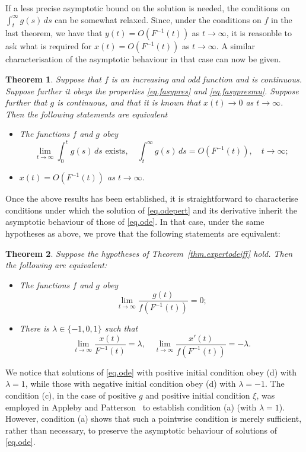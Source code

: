 \documentclass[a4paper,10pt,reqno]{amsart}
\numberwithin{equation}{section}
\newtheorem{theorem}{Theorem}
\theoremstyle{definition}
\theoremstyle{remark}
\DeclareMathOperator{\1}{\mathbbm 1}
\begin{document}
	If a less precise asymptotic bound on the solution is needed, the conditions on $\int_t^\infty g(s)\,ds$ can be somewhat relaxed. Since, under the conditions on $f$ in the last theorem, we have 
	that $y(t)=O(F^{-1}(t))$ as $t\to\infty$, it is reasonble to ask what is required for $x(t)=O(F^{-1}(t))$ as $t\to\infty$. A similar characterisation of the asymptotic behaviour in that case can now be given. 
	
	\begin{theorem} \label{thm.extpertodebdd}
		Suppose that $f$ is an increasing and odd function and is continuous. Suppose further it obeys the properties \eqref{eq.fasypres} and \eqref{eq.fasypresmu}. Suppose further that $g$ is continuous, and that it is known that $x(t)\to 0$ as $t\to\infty$. 
		Then the following statements are equivalent
		\begin{itemize}
			\item[(a)] The functions $f$ and $g$ obey
			\[
			\lim_{t\to\infty} \int_0^t g(s)\,ds \text{ exists}, \quad \int_t^\infty g(s)\,ds=O(F^{-1}(t)), \quad t\to\infty;
			\]
			\item[(b)] $x(t)=O(F^{-1}(t))$ as $t\to\infty$.
		\end{itemize} 
	\end{theorem}
	
	Once the above results has been established, it is straightforward to characterise conditions under which the solution of \eqref{eq.odepert} and its derivative inherit the asymptotic behaviour of those of \eqref{eq.ode}. In that case, under the same hypotheses as above, we prove that the following statements are equivalent:
	\begin{theorem} \label{thm.deriv} 
		Suppose the hypotheses of Theorem~\ref{thm.expertodeiff} hold. Then the following are equivalent:
		\begin{itemize}
			\item[(c)] The functions $f$ and $g$ obey 
			\[
			\lim_{t\to\infty} \frac{g(t)}{f(F^{-1}(t))}=0; 
			\]
			\item[(d)] There is $\lambda\in \{-1,0,1\}$ such that
			\[
			\lim_{t\to\infty} \frac{x(t)}{F^{-1}(t)}= \lambda, 
			\quad
			\lim_{t\to\infty} \frac{x'(t)}{f(F^{-1}(t))}=-\lambda.
			\]
		\end{itemize}
	\end{theorem}
	We notice that solutions of \eqref{eq.ode} with positive initial condition obey (d) with $\lambda=1$, while those with negative initial condition obey (d) 
	with $\lambda=-1$. The condition (c), in the case of positive $g$ and positive initial condition $\xi$, was employed in Appleby and Patterson~\cite{apppatt} to establish condition (a) (with $\lambda=1$). However, condition (a) shows that such a pointwise condition is merely sufficient, rather than necessary, to preserve the asymptotic behaviour of solutions of \eqref{eq.ode}. 
	
\end{document}
